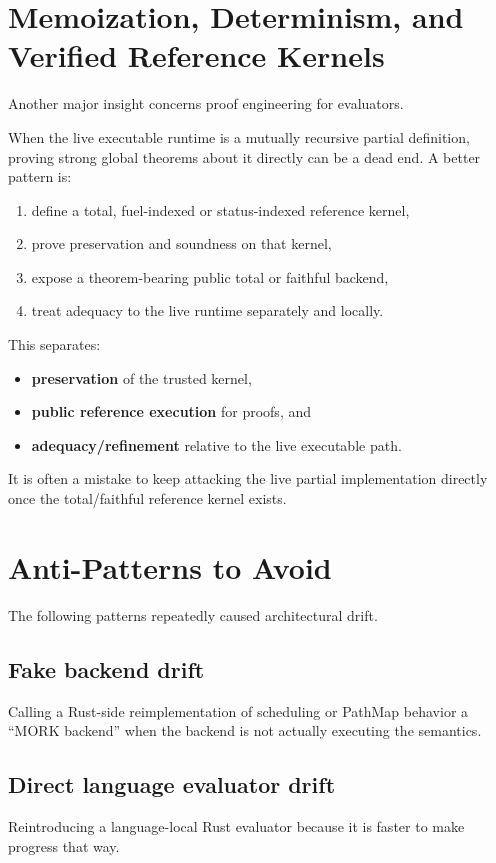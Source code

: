 \documentclass[11pt]{article}
\begin{document}
\section{Memoization, Determinism, and Verified Reference Kernels}

Another major insight concerns proof engineering for evaluators.

When the live executable runtime is a mutually recursive partial definition, proving strong global theorems about it directly can be a dead end. A better pattern is:
\begin{enumerate}
  \item define a total, fuel-indexed or status-indexed reference kernel,
  \item prove preservation and soundness on that kernel,
  \item expose a theorem-bearing public total or faithful backend,
  \item treat adequacy to the live runtime separately and locally.
\end{enumerate}

This separates:
\begin{itemize}
  \item \textbf{preservation} of the trusted kernel,
  \item \textbf{public reference execution} for proofs, and
  \item \textbf{adequacy/refinement} relative to the live executable path.
\end{itemize}

It is often a mistake to keep attacking the live partial implementation directly once the total/faithful reference kernel exists.

\section{Anti-Patterns to Avoid}

The following patterns repeatedly caused architectural drift.

\subsection{Fake backend drift}
Calling a Rust-side reimplementation of scheduling or PathMap behavior a ``MORK backend'' when the backend is not actually executing the semantics.

\subsection{Direct language evaluator drift}
Reintroducing a language-local Rust evaluator because it is faster to make progress that way.
\end{document}
